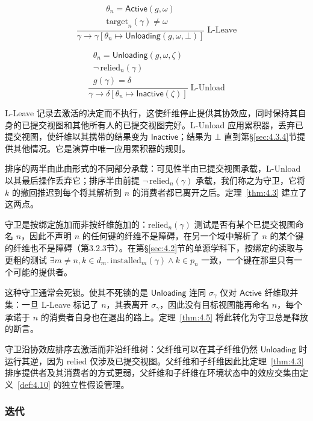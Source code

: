\[
\frac{
\begin{array}{c}
\theta_n = \mathsf{Active}(g, \omega) \\
\mathrm{target}_n(\gamma) \neq \omega
\end{array}
}{
\gamma \longrightarrow \gamma[\theta_n \mapsto \mathsf{Unloading}(g, \omega, \bot)]
}\;\text{L-Leave}
\]

\[
\frac{
\begin{array}{c}
\theta_n = \mathsf{Unloading}(g, \omega, \zeta) \\
\lnot\, \mathrm{relied}_n(\gamma) \\
g(\gamma) = \delta
\end{array}
}{
\gamma \longrightarrow \delta[\theta_n \mapsto \mathsf{Inactive}(\zeta)]
}\;\text{L-Unload}
\]

L-Leave 记录去激活的决定而不执行，这使纤维停止提供其协效应，同时保持其自身的已提交视图和其他所有人的已提交视图完好。L-Unload 应用累积器，丢弃已提交视图，使纤维以其携带的结果变为 $\mathsf{Inactive}$；结果为 $\bot$ 直到第\S\ref{sec:4.3.4}节提供其他情况。它是演算中唯一应用累积器的规则。

排序的两半由此由形式的不同部分承载：可见性半由已提交视图承载，L-Unload 以其最后操作丢弃它；排序半由前提 $\lnot\, \mathrm{relied}_n(\gamma)$ 承载，我们称之为守卫，它将 $k$ 的撤回推迟到每个将其解析到 $n$ 的消费者都已离开之后。定理~\ref{thm:4.3} 建立了这两点。

守卫是按绑定施加而非按纤维施加的：$\mathrm{relied}_n(\gamma)$ 测试是否有某个已提交视图命名 $n$，因此不声明 $n$ 的任何键的纤维不是障碍，在另一个域中解析了 $n$ 的某个键的纤维也不是障碍（第3.2.3节）。在第\S\ref{sec:4.2}节的单源学科下，按绑定的读取与更粗的测试 $\exists m \neq n, k \in d_m.\, \mathrm{installed}_m(\gamma) \land k \in p_n$ 一致，一个键在那里只有一个可能的提供者。

这种守卫通常会死锁。使其不死锁的是 $\mathsf{Unloading}$ 连同 $\sigma_\gamma$ 仅对 $\mathsf{Active}$ 纤维取并集：一旦 L-Leave 标记了 $n$，其表离开 $\sigma_\gamma$，因此没有目标视图能再命名 $n$，每个承诺于 $n$ 的消费者自身也在退出的路上。定理~\ref{thm:4.5} 将此转化为守卫总是释放的断言。

守卫沿协效应排序去激活而非沿纤维树：父纤维可以在其子纤维仍然 $\mathsf{Unloading}$ 时运行其逆，因为 $\mathrm{relied}$ 仅涉及已提交视图。父纤维和子纤维因此比定理~\ref{thm:4.3} 排序提供者及其消费者的方式更弱，父纤维和子纤维在环境状态中的效应交集由定义~\ref{def:4.10} 的独立性假设管理。

\subsubsection{迭代}\label{sec:4.3.2}

